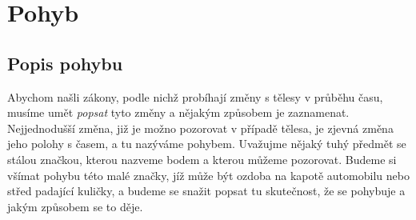{
\chapter{Pohyb}\label{chap:fey_move}
\minitoc
  \section{Popis pohybu}
    Abychom našli zákony, podle nichž probíhají změny s tělesy v průběhu času, musíme umět 
    \emph{popsat} tyto změny a nějakým způsobem je zaznamenat. Nejjednodušší změna, již je možno 
    pozorovat v případě tělesa, je zjevná změna jeho polohy s časem, a tu nazýváme pohybem. 
    Uvažujme nějaký tuhý předmět se stálou značkou, kterou nazveme bodem a kterou můžeme pozorovat. 
    Budeme si všímat pohybu této malé značky, jíž může být ozdoba na kapotě automobilu nebo střed 
    padající kuličky, a budeme se snažit popsat tu skutečnost, že se pohybuje a jakým způsobem se 
    to děje.

}
